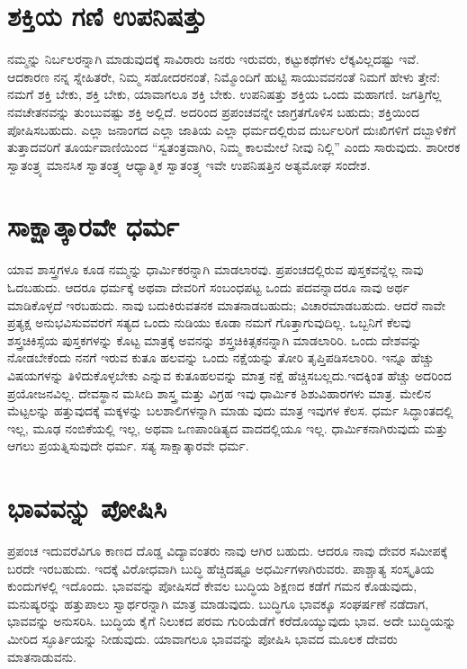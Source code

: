 \section{ಶಕ್ತಿಯ ಗಣಿ ಉಪನಿಷತ್ತು}

ನಮ್ಮನ್ನು ನಿರ್ಬಲರನ್ನಾಗಿ ಮಾಡುವುದಕ್ಕೆ ಸಾವಿರಾರು ಜನರು ಇರುವರು, ಕಟ್ಟುಕಥೆಗಳು ಲೆಕ್ಕವಿಲ್ಲದಷ್ಟು ಇವೆ. ಆದಕಾರಣ ನನ್ನ ಸ್ನೇಹಿತರೇ, ನಿಮ್ಮ ಸಹೋದರನಂತೆ, ನಿಮ್ಮೊಂದಿಗೆ ಹುಟ್ಟಿ ಸಾಯುವವನಂತೆ ನಿಮಗೆ ಹೇಳು ತ್ತೇನೆ: ನಮಗೆ ಶಕ್ತಿ ಬೇಕು, ಶಕ್ತಿ ಬೇಕು, ಯಾವಾಗಲೂ ಶಕ್ತಿ ಬೇಕು. ಉಪನಿಷತ್ತು ಶಕ್ತಿಯ ಒಂದು ಮಹಾಗಣಿ. ಜಗತ್ತಿಗೆಲ್ಲ ನವಚೇತನವನ್ನು ತುಂಬುವಷ್ಟು ಶಕ್ತಿ ಅಲ್ಲಿದೆ. ಅದರಿಂದ ಪ್ರಪಂಚವನ್ನೇ ಜಾಗ್ರತಗೊಳಿಸ ಬಹುದು; ಶಕ್ತಿಯಿಂದ ಪೋಷಿಸಬಹುದು. ಎಲ್ಲಾ ಜನಾಂಗದ ಎಲ್ಲಾ ಜಾತಿಯ ಎಲ್ಲಾ ಧರ್ಮದಲ್ಲಿರುವ ದುರ್ಬಲರಿಗೆ ದುಃಖಿಗಳಿಗೆ ದಬ್ಬಾಳಿಕೆಗೆ ತುತ್ತಾದವರಿಗೆ ತೂರ್ಯವಾಣಿಯಿಂದ “ಸ್ವತಂತ್ರವಾಗಿರಿ, ನಿಮ್ಮ ಕಾಲಮೇಲೆ ನೀವು ನಿಲ್ಲಿ” ಎಂದು ಸಾರುವುದು. ಶಾರೀರಕ ಸ್ವಾತಂತ್ರ್ಯ ಮಾನಸಿಕ ಸ್ವಾತಂತ್ರ್ಯ ಆಧ್ಯಾತ್ಮಿಕ ಸ್ವಾತಂತ್ರ್ಯ ಇವೇ ಉಪನಿಷತ್ತಿನ ಅತ್ಯಮೋಘ ಸಂದೇಶ.


\section{ಸಾಕ್ಷಾತ್ಕಾರವೇ ಧರ್ಮ}

ಯಾವ ಶಾಸ್ತ್ರಗಳೂ ಕೂಡ ನಮ್ಮನ್ನು ಧಾರ್ಮಿಕರನ್ನಾಗಿ ಮಾಡಲಾರವು. ಪ್ರಪಂಚದಲ್ಲಿರುವ ಪುಸ್ತಕವನ್ನೆಲ್ಲ ನಾವು ಓದಬಹುದು. ಆದರೂ ಧರ್ಮಕ್ಕೆ ಅಥವಾ ದೇವರಿಗೆ ಸಂಬಂಧಪಟ್ಟ ಒಂದು ಪದವನ್ನಾದರೂ ನಾವು ಅರ್ಥ ಮಾಡಿಕೊಳ್ಳದೆ ಇರಬಹುದು. ನಾವು ಬದುಕಿರುವತನಕ ಮಾತನಾಡಬಹುದು; ವಿಚಾರಮಾಡಬಹುದು. ಆದರೆ ನಾವೇ ಪ್ರತ್ಯಕ್ಷ ಅನುಭವಿಸುವವರಗೆ ಸತ್ಯದ ಒಂದು ನುಡಿಯು ಕೂಡಾ ನಮಗೆ ಗೊತ್ತಾಗುವುದಿಲ್ಲ. ಒಬ್ಬನಿಗೆ ಕೆಲವು ಶಸ್ತ್ರಚಿಕಿಸ್ಸೆಯ ಪುಸ್ತಕಗಳನ್ನು ಕೊಟ್ಟ ಮಾತ್ರಕ್ಕೆ ಅವನನ್ನು ಶಸ್ತ್ರಚಿಕಿತ್ಸಕನನ್ನಾಗಿ ಮಾಡಲಾರಿರಿ. ಒಂದು ದೇಶವನ್ನು ನೋಡಬೇಕೆಂದು ನನಗೆ ಇರುವ ಕುತೂ ಹಲವನ್ನು ಒಂದು ನಕ್ಷೆಯನ್ನು ತೋರಿ ತೃಪ್ತಿಪಡಿಸಲಾರಿರಿ. ಇನ್ನೂ ಹೆಚ್ಚು ವಿಷಯಗಳನ್ನು ತಿಳಿದುಕೊಳ್ಳಬೇಕು ಎನ್ನುವ ಕುತೂಹಲವನ್ನು ಮಾತ್ರ ನಕ್ಷೆ ಹೆಚ್ಚಿಸಬಲ್ಲದು.ಇದಕ್ಕಿಂತ ಹೆಚ್ಚು ಅದರಿಂದ ಪ್ರಯೋಜನವಿಲ್ಲ. ದೇವಸ್ಥಾನ ಮಸೀದಿ ಶಾಸ್ತ್ರ ಮತ್ತು ವಿಗ್ರಹ ಇವು ಧಾರ್ಮಿಕ ಶಿಶುವಿಹಾರಗಳು ಮಾತ್ರ. ಮೇಲಿನ ಮೆಟ್ಟಲನ್ನು ಹತ್ತುವುದಕ್ಕೆ ಮಕ್ಕಳನ್ನು ಬಲಶಾಲಿಗಳನ್ನಾಗಿ ಮಾಡು ವುದು ಮಾತ್ರ ಇವುಗಳ ಕೆಲಸ. ಧರ್ಮ ಸಿದ್ಧಾಂತದಲ್ಲಿ ಇಲ್ಲ, ಮೂಢ ನಂಬಿಕೆಯಲ್ಲಿ ಇಲ್ಲ, ಅಥವಾ ಒಣಪಾಂಡಿತ್ಯದ ವಾದದಲ್ಲಿಯೂ ಇಲ್ಲ. ಧಾರ್ಮಿಕನಾಗಿರುವುದು ಮತ್ತು ಆಗಲು ಪ್ರಯತ್ನಿಸುವುದೇ ಧರ್ಮ. ಸತ್ಯ ಸಾಕ್ಷಾತ್ಕಾರವೇ ಧರ್ಮ.


\section{ಭಾವವನ್ನು ಪೋಷಿಸಿ}

ಪ್ರಪಂಚ ಇದುವರೆವಿಗೂ ಕಾಣದ ದೊಡ್ಡ ವಿದ್ಯಾವಂತರು ನಾವು ಆಗಿರ ಬಹುದು. ಆದರೂ ನಾವು ದೇವರ ಸಮೀಪಕ್ಕೆ ಬರದೇ ಇರಬಹುದು. ಇದಕ್ಕೆ ವಿರೋಧವಾಗಿ ಬುದ್ಧಿ ಹೆಚ್ಚಿದಷ್ಟೂ ಅಧರ್ಮಿಗಳಾಗಿರುವರು. ಪಾಶ್ಚಾತ್ಯ ಸಂಸ್ಕೃತಿಯ ಕುಂದುಗಳಲ್ಲಿ ಇದೊಂದು. ಭಾವವನ್ನು ಪೋಷಿಸದೆ ಕೇವಲ ಬುದ್ಧಿಯ ಶಿಕ್ಷಣದ ಕಡೆಗೆ ಗಮನ ಕೊಡುವುದು, ಮನುಷ್ಯರನ್ನು ಹತ್ತುಪಾಲು ಸ್ವಾರ್ಥರನ್ನಾಗಿ ಮಾತ್ರ ಮಾಡುವುದು. ಬುದ್ಧಿಗೂ ಭಾವಕ್ಕೂ ಸಂಘರ್ಷಣೆ ನಡೆದಾಗ, ಭಾವವನ್ನು ಅನುಸರಿಸಿ. ಬುದ್ಧಿಯ ಕೈಗೆ ನಿಲುಕದ ಪರಮ ಗುರಿಯೆಡೆಗೆ ಕರೆದೊಯ್ಯುವುದು ಭಾವ. ಅದೇ ಬುದ್ಧಿಯನ್ನು ಮೀರಿದ ಸ್ಫೂರ್ತಿಯನ್ನು ನೀಡುವುದು. ಯಾವಾಗಲೂ ಭಾವವನ್ನು ಪೋಷಿಸಿ ಭಾವದ ಮೂಲಕ ದೇವರು ಮಾತನಾಡುವನು.


